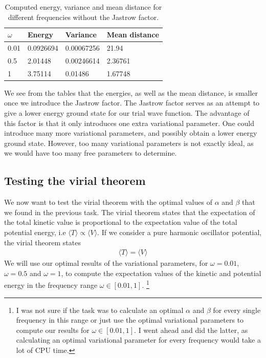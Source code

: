 \documentclass[12pt]{article}
\begin{document}
\begin{table}
\begin{center}
	\begin{tabular}{| l | l | l | l |}
	\hline
	 $\omega$ & Energy & Variance & Mean distance \\ \hline
	 0.01 & 0.0926694 & 0.00067256 & 21.94 \\
	 0.5 & 2.01448 & 0.00246614 & 2.36761 \\
	 1 & 3.75114 & 0.01486 & 1.67748 \\ \hline
	\end{tabular}
\caption{Computed energy, variance and mean distance for different frequencies without the Jastrow factor.}
\label{table:Non-Jastrow-Result}
\end{center}
\end{table}
We see from the tables that the energies, as well as the mean distance, is smaller once we introduce the Jastrow factor. The Jastrow factor serves as an attempt to give a lower energy ground state for our trial wave function. The advantage of this factor is that it only introduces one extra variational parameter. One could introduce many more variational parameters, and possibly obtain a lower energy ground state. However, too many variational parameters is not exactly ideal, as we would have too many free parameters to determine.

\FloatBarrier
\subsection{Testing the virial theorem}
We now want to test the virial theorem with the optimal values of $\alpha$ and $\beta$ that we found in the previous  task. The virial theorem states that the expectation of the total kinetic value is proportional to the expectation value of the total potential energy, i.e $\langle T \rangle \propto \langle V \rangle$. If we consider a pure harmonic oscillator potential, the virial theorem states
\begin{align*}
\langle T \rangle = \langle V \rangle
\end{align*}
We will use our optimal results of the variational parameters, for $\omega = 0.01$, $\omega = 0.5$ and $\omega=1$, to compute the expectation values of the kinetic and potential energy in the frequency range $\omega \in [0.01, 1]$. \footnote{I was not sure if the task was to calculate an optimal $\alpha$ and $\beta$ for every single frequency in this range or just use the optimal variational parameters to compute our results for $\omega \in [0.01, 1]$. I went ahead and did the latter, as calculating an optimal variational parameter for every frequency would take a lot of CPU time.}
\end{document}
